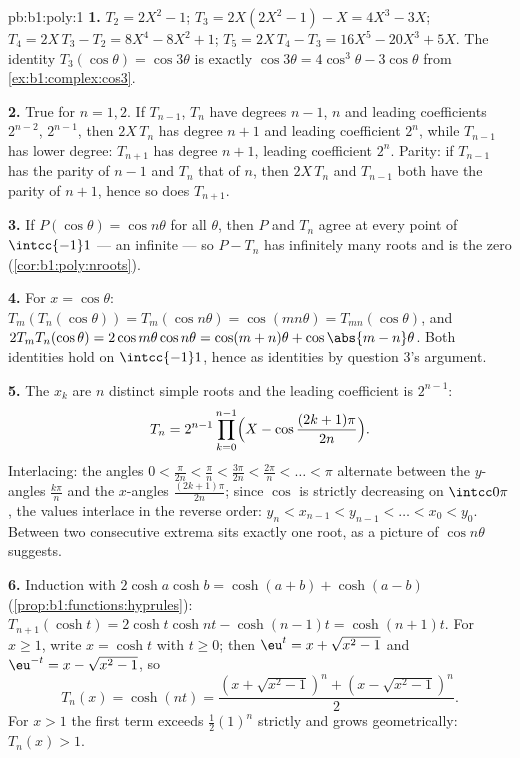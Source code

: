 \begin{solution}{pb:b1:poly:1}
\textbf{1.} $T_2 = 2X^2 - 1$; $T_3 = 2X(2X^2 - 1) - X = 4X^3 -
3X$; $T_4 = 2X\,T_3 - T_2 = 8X^4 - 8X^2 + 1$; $T_5 = 2X\,T_4 - T_3
= 16X^5 - 20X^3 + 5X$. The identity $T_3(\cos\theta) = \cos3\theta$
is exactly $\cos3\theta = 4\cos^3\theta - 3\cos\theta$ from
\cref{ex:b1:complex:cos3}.

\textbf{2.} True for $n = 1, 2$. If $T_{n-1}$, $T_n$ have degrees
$n-1$, $n$ and leading coefficients $2^{n-2}$, $2^{n-1}$, then
$2X\,T_n$ has degree $n+1$ and leading coefficient $2^n$, while
$T_{n-1}$ has lower degree: $T_{n+1}$ has degree $n + 1$, leading
coefficient $2^n$. Parity: if $T_{n-1}$ has the parity of $n - 1$
and $T_n$ that of $n$, then $2X\,T_n$ and $T_{n-1}$ both have the
parity of $n + 1$, hence so does $T_{n+1}$.

\textbf{3.} If $P(\cos\theta) = \cos n\theta$ for all $\theta$,
then $P$ and $T_n$ agree at every point of $\intcc{-1}1$ --- an
infinite  --- so $P - T_n$ has infinitely many roots and is the
zero  (\cref{cor:b1:poly:nroots}).

\textbf{4.} For $x = \cos\theta$: $T_m(T_n(\cos\theta)) =
T_m(\cos n\theta) = \cos(mn\theta) = T_{mn}(\cos\theta)$, and
$2T_mT_n(\cos\theta) = 2\cos m\theta\cos n\theta = \cos(m+n)\theta
+ \cos\abs{m - n}\theta$. Both identities hold on $\intcc{-1}1$,
hence as  identities by question 3's argument.

\textbf{5.} The $x_k$ are $n$ distinct simple roots and the
leading coefficient is $2^{n-1}$:
\[
T_n = 2^{n-1}\prod_{k=0}^{n-1}
\Bigl(X - \cos\frac{(2k+1)\pi}{2n}\Bigr) .
\]
Interlacing: the angles $0 < \frac{\pi}{2n} < \frac\pi n <
\frac{3\pi}{2n} < \frac{2\pi}n < \dots < \pi$ alternate between
the $y$-angles $\frac{k\pi}n$ and the $x$-angles
$\frac{(2k+1)\pi}{2n}$; since $\cos$ is strictly decreasing on
$\intcc0\pi$, the values interlace in the reverse order: $y_n <
x_{n-1} < y_{n-1} < \dots < x_0 < y_0$. Between two consecutive
extrema sits exactly one root, as a picture of $\cos n\theta$
suggests.

\textbf{6.} Induction with $2\cosh a\cosh b = \cosh(a + b) +
\cosh(a - b)$ (\cref{prop:b1:functions:hyprules}): $T_{n+1}(\cosh
t) = 2\cosh t\cosh nt - \cosh(n-1)t = \cosh(n+1)t$. For $x \geq
1$, write $x = \cosh t$ with $t \geq 0$; then $\eu^t = x +
\sqrt{x^2 - 1}$ and $\eu^{-t} = x - \sqrt{x^2 - 1}$, so
\[
T_n(x) = \cosh(nt)
= \frac{(x + \sqrt{x^2-1})^n + (x - \sqrt{x^2-1})^n}2 .
\]
For $x > 1$ the first term exceeds $\frac12(1)^n$ strictly and
grows geometrically: $T_n(x) > 1$.


\end{solution}
